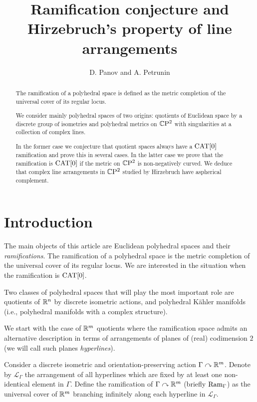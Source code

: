 \documentclass[oneside,a4paper]{article}
\def\Ram{\mathop{\rm Ram}\nolimits}
\begin{document}
\title{Ramification conjecture and Hirzebruch's property of line arrangements}
\author{D. Panov and A. Petrunin}
\date{}
\maketitle

\begin{abstract}

The ramification of a polyhedral space is defined as the metric completion of the universal cover of its regular locus.

We consider mainly 
polyhedral spaces of two origins: quotients of Euclidean space by a discrete group of isometries and polyhedral metrics on $\mathbb{C}\mathrm{P}^2$ with singularities at a collection of complex lines. 

In the former case we conjecture that quotient spaces always have a $\mathrm{CAT}[0]$ ramification and prove this in several cases.  In the latter case  we prove that the ramification is $\mathrm{CAT}[0]$ if the metric on $\mathbb{C}\mathrm{P}^2$ is non-negatively curved. We deduce that complex line arrangements in $\mathbb{C}\mathrm{P}^2$ studied by Hirzebruch have aspherical complement.
\end{abstract}


\section{Introduction}

The main objects of this article are Euclidean polyhedral spaces and their \emph {ramifications}. The ramification  of a polyhedral space is the metric completion of the universal cover of its regular locus. We are interested in the situation when the ramification is $\mathrm{CAT}[0]$. 

Two classes of polyhedral spaces that will play the most important role are quotients of $\mathbb{R}^n$ by discrete isometric actions, and polyhedral K\"ahler manifolds (i.e., polyhedral manifolds with a complex structure). 

We start with the case of $\mathbb{R}^m$ quotients where the ramification space admits an alternative description in terms of  arrangements of planes of (real) codimension $2$ (we will call such planes \emph{hyperlines}).

Consider a discrete isometric and orientation-preserving action $\Gamma\curvearrowright\mathbb{R}^m$.
Denote by $\mathcal{L}_\Gamma$ the arrangement of all hyperlines which are fixed by at least one non-identical element in $\Gamma$. Define the ramification of $\Gamma\curvearrowright\mathbb{R}^m$
(briefly $\Ram_\Gamma$)
as the universal cover of $\mathbb{R}^m$  branching infinitely  along each hyperline in $\mathcal{L}_\Gamma$.
\end{document}
